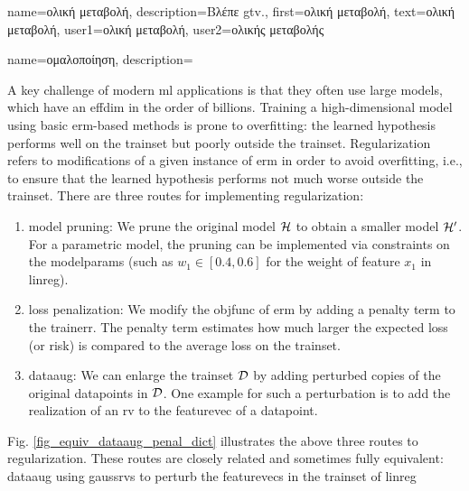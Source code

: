 {name={\foreignlanguage{greek}{ολική μεταβολή}}, 
	description={\foreignlanguage{greek}{Βλέπε} \gls{gtv}.},
	first={\foreignlanguage{greek}{ολική μεταβολή}},
	text={\foreignlanguage{greek}{ολική μεταβολή}},
	user1={\foreignlanguage{greek}{ολική μεταβολή}}, %
	user2={\foreignlanguage{greek}{ολικής μεταβολής}} %
}

{name={\foreignlanguage{greek}{ομαλοποίηση}}, 
	description={A key challenge of modern \gls{ml} applications is that they often 
		use large \gls{model}s, which have an \gls{effdim} in the order of billions. 
		Training a high-dimensional \gls{model} using basic \gls{erm}-based methods
		is prone to \gls{overfitting}: the learned \gls{hypothesis} performs well on the \gls{trainset} 
		but poorly outside the \gls{trainset}. Regularization refers to modifications of a given instance 
		of \gls{erm} in order to avoid \gls{overfitting}, i.e., to ensure that the learned \gls{hypothesis} performs 
		not much worse outside the \gls{trainset}. There are three routes for implementing 
		regularization: 
		\begin{enumerate}[label=\arabic*)]
			\item {\Gls{model} pruning:} We prune the original \gls{model} $\mathcal{H}$ to obtain a 
			smaller \gls{model} $\mathcal{H}'$. For a parametric \gls{model}, the pruning can be 
			implemented via constraints on the \gls{modelparams} (such as $w_{1} \in [0.4,0.6]$ for 
			the weight of \gls{feature} $x_{1}$ in \gls{linreg}).
			\item {\Gls{loss} penalization:} We modify the \gls{objfunc} of \gls{erm} by adding a 
			penalty term to the \gls{trainerr}. The penalty term estimates how much larger the expected \gls{loss} (or \gls{risk}) 
			is compared to the average \gls{loss} on the \gls{trainset}. 
			\item {\Gls{dataaug}:} We can enlarge the \gls{trainset} $\mathcal{D}$ by adding 
			perturbed copies of the original \gls{datapoint}s in $\mathcal{D}$. One example for such 
			a perturbation is to add the \gls{realization} of an \gls{rv} to the \gls{featurevec} 
			of a \gls{datapoint}. 
		\end{enumerate} 
		Fig. \ref{fig_equiv_dataaug_penal_dict} illustrates the above three routes to regularization. 
		These routes are closely related and sometimes fully equivalent: \gls{dataaug} using \gls{gaussrv}s 
		to perturb the \gls{featurevec}s in the \gls{trainset} of \gls{linreg} 
}}
